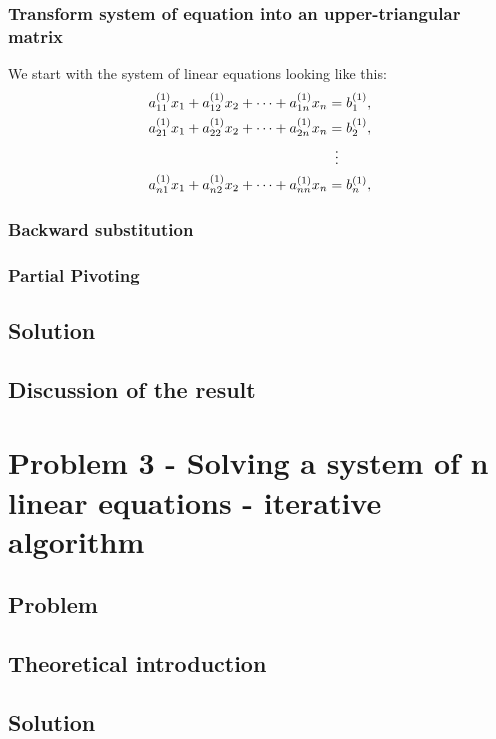 \documentclass{report}
\begin{document}
\subsection{Transform system of equation into an upper-triangular matrix}
We start with the system of linear equations looking like this:
\begin{align*}
a_{11}^{(1)} x_1 + a_{12}^{(1)}  x_2 + \cdots + a_{1n}^{(1)}  x_n &= b_1^{(1)}, \\
a_{21}^{(1)} x_1 + a_{22}^{(1)}  x_2 + \cdots + a_{2n}^{(1)}  x_n &= b_2^{(1)}, \\
&\vdotswithin{=} \\
a_{n1}^{(1)} x_1 + a_{n2}^{(1)}  x_2 + \cdots + a_{nn}^{(1)}  x_n &= b_n^{(1)}, \\
\end{align*}

\subsection{Backward substitution}

\subsection{Partial Pivoting}

\section{Solution}

\section{Discussion of the result}

\chapter{Problem 3 - Solving a system of n linear equations - iterative algorithm}

\section{Problem}

\section{Theoretical introduction}

\section{Solution}
\end{document}
